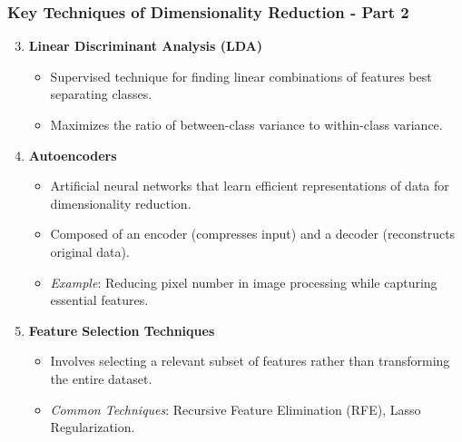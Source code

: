 \documentclass[aspectratio=169]{beamer}
\begin{document}
\begin{frame}[fragile]
    \frametitle{Key Techniques of Dimensionality Reduction - Part 2}
    \begin{enumerate}
        \setcounter{enumi}{2}
        \item \textbf{Linear Discriminant Analysis (LDA)}
            \begin{itemize}
                \item Supervised technique for finding linear combinations of features best separating classes.
                \item Maximizes the ratio of between-class variance to within-class variance.
            \end{itemize}
        \item \textbf{Autoencoders}
            \begin{itemize}
                \item Artificial neural networks that learn efficient representations of data for dimensionality reduction.
                \item Composed of an encoder (compresses input) and a decoder (reconstructs original data).
                \item \textit{Example}: Reducing pixel number in image processing while capturing essential features.
            \end{itemize}
        \item \textbf{Feature Selection Techniques}
            \begin{itemize}
                \item Involves selecting a relevant subset of features rather than transforming the entire dataset.
                \item \textit{Common Techniques}: Recursive Feature Elimination (RFE), Lasso Regularization.
            \end{itemize}
    \end{enumerate}
\end{frame}
\end{document}
